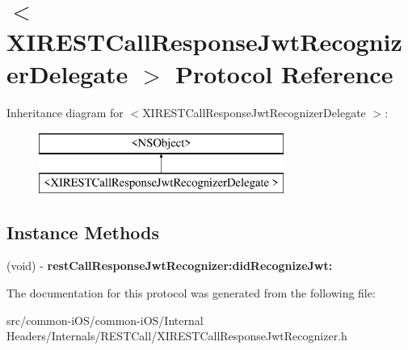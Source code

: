 \hypertarget{protocol_x_i_r_e_s_t_call_response_jwt_recognizer_delegate_01-p}{}\section{$<$X\+I\+R\+E\+S\+T\+Call\+Response\+Jwt\+Recognizer\+Delegate $>$ Protocol Reference}
\label{protocol_x_i_r_e_s_t_call_response_jwt_recognizer_delegate_01-p}
Inheritance diagram for $<$X\+I\+R\+E\+S\+T\+Call\+Response\+Jwt\+Recognizer\+Delegate $>$\+:\begin{figure}[H]
\begin{center}
\leavevmode
\includegraphics[height=2.000000cm]{protocol_x_i_r_e_s_t_call_response_jwt_recognizer_delegate_01-p}
\end{center}
\end{figure}
\subsection*{Instance Methods}
\begin{DoxyCompactItemize}
\item 
\hypertarget{protocol_x_i_r_e_s_t_call_response_jwt_recognizer_delegate_01-p_a66c7d6120649b9b78d2114459fe73e20}{}\label{protocol_x_i_r_e_s_t_call_response_jwt_recognizer_delegate_01-p_a66c7d6120649b9b78d2114459fe73e20} 
(void) -\/ {\bfseries rest\+Call\+Response\+Jwt\+Recognizer\+:did\+Recognize\+Jwt\+:}
\end{DoxyCompactItemize}


The documentation for this protocol was generated from the following file\+:\begin{DoxyCompactItemize}
\item 
src/common-\/i\+O\+S/common-\/i\+O\+S/\+Internal Headers/\+Internals/\+R\+E\+S\+T\+Call/X\+I\+R\+E\+S\+T\+Call\+Response\+Jwt\+Recognizer.\+h\end{DoxyCompactItemize}
